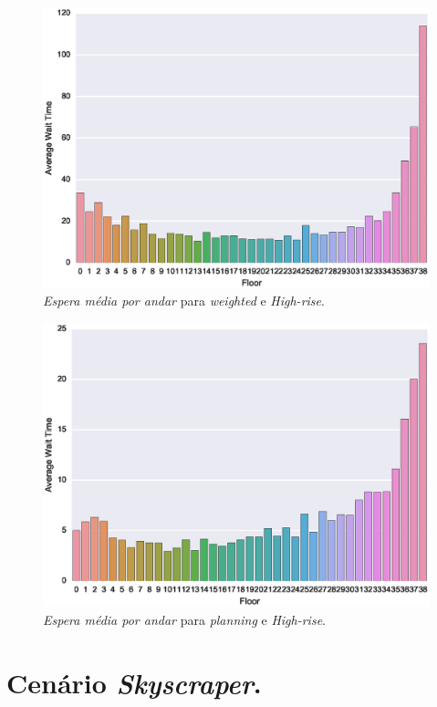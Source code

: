 \begin{figure}[H]
  \centering
  \includegraphics[scale=0.8]{img/results/High-rise/4_Simple_Weighted/averageWaitTime}
  \caption{\textit{Espera média por andar} para \textit{weighted} e \textit{High-rise}.}
  \label{fig:result:high-rise:avgwt:weighted}
\end{figure}

\begin{figure}[H]
  \centering
  \includegraphics[scale=0.8]{img/results/High-rise/5_Planning_Random/averageWaitTime}
  \caption{\textit{Espera média por andar} para \textit{planning} e \textit{High-rise}.}
  \label{fig:result:high-rise:avgwt:planning}
\end{figure}

\section{Cenário \textit{Skyscraper}.}

